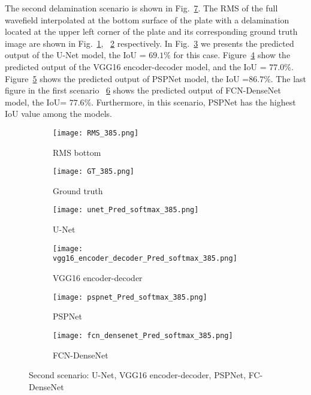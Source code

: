 The second delamination scenario is shown in Fig.~\ref{fig:385_softmax}. 
The RMS of the full wavefield interpolated at the bottom surface of the plate with a delamination located at the upper left corner of the plate and its corresponding ground truth image are shown in Fig.~\ref{fig:RMS_flat_shell_Vz_385}, ~\ref{fig:m1_rand_single_delam_385} respectively. 
In Fig.~\ref{fig:Unet_Pred__softmax_385} we presents the predicted output of the U-Net model, the IoU = \(69.1\%\) for this case.
Figure~\ref{fig:vgg16_pred__softmax_385} show the predicted output of the VGG16 encoder-decoder model, and the IoU = \(77.0\%\). 
Figure~\ref{fig:pspnet_pred__softmax_385} shows the predicted output of PSPNet model, the IoU =\(86.7\%\).
The last figure in the first scenario ~\ref{fig:fcn_densenet_pred__softmax_385}	shows the predicted output of FCN-DenseNet model, the IoU= \(77.6\%\). 
Furthermore, in this scenario, PSPNet has the highest IoU value among the models.
\begin{figure}[!h]
	\centering
	\begin{subfigure}[b]{0.47\textwidth}
		\centering
		\texttt{[image: RMS\_385.png]}
		\caption{RMS bottom}
		\label{fig:RMS_flat_shell_Vz_385}
	\end{subfigure}
	\hfill
	\begin{subfigure}[b]{0.47\textwidth}
		\centering
		\texttt{[image: GT\_385.png]}
		\caption{Ground truth}
		\label{fig:m1_rand_single_delam_385}
	\end{subfigure}
	\begin{subfigure}[b]{0.47\textwidth}
		\centering
		\texttt{[image: unet\_Pred\_softmax\_385.png]}
		\caption{U-Net}
		\label{fig:Unet_Pred__softmax_385}
	\end{subfigure}
	\hfill
	\begin{subfigure}[b]{0.47\textwidth}
		\centering
		\texttt{[image: vgg16\_encoder\_decoder\_Pred\_softmax\_385.png]}
		\caption{VGG16 encoder-decoder}			\label{fig:vgg16_pred__softmax_385}			
	\end{subfigure}
	\hfill
	\begin{subfigure}[b]{0.47\textwidth}
		\centering
		\texttt{[image: pspnet\_Pred\_softmax\_385.png]}
		\caption{PSPNet}
		\label{fig:pspnet_pred__softmax_385}
	\end{subfigure}	
	\hfill
	\begin{subfigure}[b]{0.47\textwidth}
		\centering
		\texttt{[image: fcn\_densenet\_Pred\_softmax\_385.png]}
		\caption{FCN-DenseNet}
		\label{fig:fcn_densenet_pred__softmax_385}
	\end{subfigure}	
	\caption{Second scenario: U-Net, VGG16 encoder-decoder, PSPNet, FC-DenseNet}
	\label{fig:385_softmax}
\end{figure}

